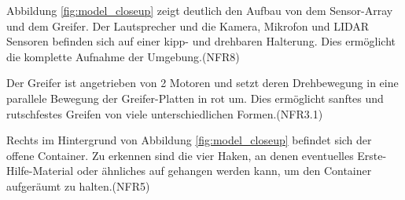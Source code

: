 Abbildung \ref{fig:model_closeup} zeigt deutlich den Aufbau von dem Sensor-Array und dem Greifer.
Der Lautsprecher und die Kamera, Mikrofon und LIDAR Sensoren 
befinden sich auf einer kipp- und drehbaren Halterung.
Dies ermöglicht die komplette Aufnahme der Umgebung.(NFR8)

Der Greifer ist angetrieben von 2 Motoren und setzt deren Drehbewegung 
in eine parallele Bewegung der Greifer-Platten in rot um.
Dies ermöglicht sanftes und rutschfestes Greifen von viele unterschiedlichen Formen.(NFR3.1)

Rechts im Hintergrund von Abbildung \ref{fig:model_closeup} befindet sich der offene Container.
Zu erkennen sind die vier Haken, 
an denen eventuelles Erste-Hilfe-Material oder ähnliches auf gehangen werden kann,
um den Container aufgeräumt zu halten.(NFR5)

